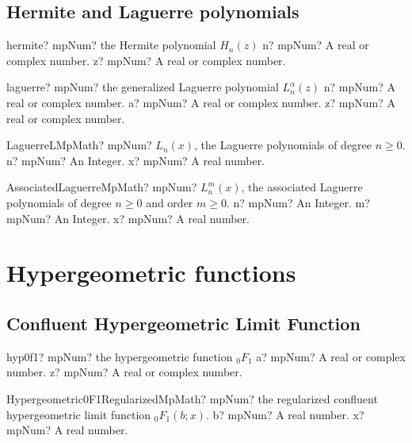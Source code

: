 \documentclass[12pt,a4paper,openany]{book}
\begin{document}
\section{Hermite and Laguerre polynomials}

\begin{mpFunctionsExtract}
\mpFunctionTwo
{hermite? mpNum? the Hermite polynomial $H_n(z)$}
{n? mpNum? A real or complex number.}
{z? mpNum? A real or complex number.}
\end{mpFunctionsExtract}

\begin{mpFunctionsExtract}
\mpFunctionThree
{laguerre? mpNum? the generalized Laguerre polynomial $L_n^{\alpha}(z)$}
{n? mpNum? A real or complex number.}
{a? mpNum? A real or complex number.}
{z? mpNum? A real or complex number.}
\end{mpFunctionsExtract}

\begin{mpFunctionsExtract}
\mpFunctionTwoNotImplemented
{LaguerreLMpMath? mpNum? $L_n (x)$, the Laguerre polynomials of degree $n \geq 0$.}
{n? mpNum? An Integer.}
{x? mpNum? A real number.}
\end{mpFunctionsExtract}

\begin{mpFunctionsExtract}
\mpFunctionThreeNotImplemented
{AssociatedLaguerreMpMath? mpNum? $L^m_n (x)$, the associated Laguerre polynomials of degree $n \geq 0$ and order $m \geq 0$.}
{n? mpNum? An Integer.}
{m? mpNum? An Integer.}
{x? mpNum? A real number.}
\end{mpFunctionsExtract}

\chapter{Hypergeometric functions}

\section{Confluent Hypergeometric Limit Function}

\begin{mpFunctionsExtract}
\mpFunctionTwo
{hyp0f1? mpNum? the hypergeometric function ${}_0F_1$}
{a? mpNum? A real or complex number.}
{z? mpNum? A real or complex number.}
\end{mpFunctionsExtract}

\begin{mpFunctionsExtract}
\mpFunctionTwoNotImplemented
{Hypergeometric0F1RegularizedMpMath? mpNum? the regularized confluent hypergeometric limit function ${}_0F_1(b; x)$.}
{b? mpNum? A real number.}
{x? mpNum? A real number.}
\end{mpFunctionsExtract}
\end{document}
